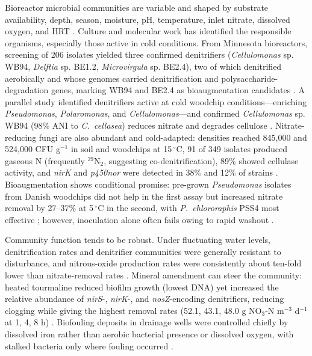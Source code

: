 Bioreactor microbial communities are variable and shaped by substrate availability, depth, season, moisture, pH, temperature, inlet nitrate, dissolved oxygen, and HRT \parencite{Hartfiel2022}. Culture and molecular work has identified the responsible organisms, especially those active in cold conditions. From Minnesota bioreactors, screening of 206 isolates yielded three confirmed denitrifiers (\textit{Cellulomonas} sp. WB94, \textit{Delftia} sp. BE1.2, \textit{Microvirgula} sp. BE2.4), two of which denitrified aerobically and whose genomes carried denitrification and polysaccharide-degradation genes, marking WB94 and BE2.4 as bioaugmentation candidates \parencite{Anderson2020}. A parallel study identified denitrifiers active at cold woodchip conditions---enriching \textit{Pseudomonas}, \textit{Polaromonas}, and \textit{Cellulomonas}---and confirmed \textit{Cellulomonas} sp. WB94 (98\% ANI to \textit{C.\ cellasea}) reduces nitrate and degrades cellulose \parencite{Jang2019}. Nitrate-reducing fungi are also abundant and cold-adapted: densities reached 845,000 and 524,000 CFU g$^{-1}$ in soil and woodchips at 15\,$^{\circ}$C, 91 of 349 isolates produced gaseous N (frequently $^{29}$N$_2$, suggesting co-denitrification), 89\% showed cellulase activity, and \textit{nirK} and \textit{p450nor} were detected in 38\% and 12\% of strains \parencite{Aldossari2021}. Bioaugmentation shows conditional promise: pre-grown \textit{Pseudomonas} isolates from Danish woodchips did not help in the first assay but increased nitrate removal by 27--37\% at 5\,$^{\circ}$C in the second, with \textit{P.\ chlororaphis} PSS4 most effective \parencite{Jeglot2022}; however, inoculation alone often fails owing to rapid washout \parencite{Wang2025b}.

Community function tends to be robust. Under fluctuating water levels, denitrification rates and denitrifier communities were generally resistant to disturbance, and nitrous-oxide production rates were consistently about ten-fold lower than nitrate-removal rates \parencite{Hathaway2017}. Mineral amendment can steer the community: heated tourmaline reduced biofilm growth (lowest DNA) yet increased the relative abundance of \textit{nirS}-, \textit{nirK}-, and \textit{nosZ}-encoding denitrifiers, reducing clogging while giving the highest removal rates (52.1, 43.1, 48.0 g NO$_3$-N m$^{-3}$ d$^{-1}$ at 1, 4, 8 h) \parencite{Ma2021}. Biofouling deposits in drainage wells were controlled chiefly by dissolved iron rather than aerobic bacterial presence or dissolved oxygen, with stalked bacteria only where fouling occurred \parencite{Stuetz2004}.

